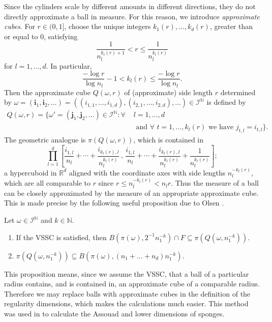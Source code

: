Since the cylinders scale by different amounts in different directions, they do not directly approximate a ball in measure.  For this reason, we introduce \emph{approximate cubes}. For $r\in (0,1]$, choose the unique integers $k_1(r),\ldots,k_d(r)$, greater than or equal to 0, satisfying
\[
\frac{1}{n_l^{k_l(r)+1}}< r \leq \frac{1}{n_l^{k_l(r)}}
\]
for $l=1,\ldots,d$. In particular, 
\[
\frac{-\log r}{\log n_l}-1 < k_l(r) \leq \frac{-\log r}{\log n_l}.
\]
Then the approximate cube $Q(\omega, r)$ of (approximate) side length $r$ determined by $\omega =\left( \textbf{i}_1, \textbf{i}_2 , \ldots \right) =\left( (i_{1,1}, \dots, i_{1,d}), (i_{2,1}, \dots, i_{2,d}) , \ldots \right)    \in \mathcal{I}^{\mathbb{N}}$ is defined by
\begin{align*}
Q(\omega, r)=\big\{ \omega'=\left( \textbf{j}_1, \textbf{j}_2 , \ldots \right)\in \mathcal{I}^{\mathbb{N}} : \forall \, \,  &l=1, \ldots, d \\
&\text{ and } \forall\, \, t= 1, \ldots, k_l(r) \text{ we have } j_{t,l}=i_{t,l} \big\}.
\end{align*}
The geometric analogue is $\pi\left(Q(\omega, r)\right)$, which is contained in
\[ 
\prod_{l=1}^d \left[\frac{i_{1,l}}{n_l}+\cdots+\frac{i_{k_l(r),l}}{n_l^{k_l(r)}} \, , \, \frac{i_{1,l}}{n_l}+\cdots+\frac{i_{k_l(r),l}}{n_l^{k_l(r)}}+\frac{1}{n_l^{k_l(r)}} \right];
\]
a hypercuboid in $\mathbb{R}^d$ aligned with the coordinate axes with side lengths $n_l^{-k_l(r)}$, which are all comparable to $r$ since $ r \leq n_l^{-k_l(r)} < n_l r$.  Thus the measure of a ball can be closely approximated by the measure of an appropriate approximate cube.  This is made precise by the following useful proposition due to Olsen \cite[Proposition 6.2.1]{sponges}.
\begin{proposition} \label{ch-upper-reg:ballscubes}
	Let $\omega \in \mathcal{I}^{\mathbb{N}}$ and $k \in \mathbb{N}$.
	\begin{enumerate} 
		\item If the VSSC is satisfied, then $B\left( \pi(\omega), 2^{-1}n_1^{-k}\right)\cap F \subseteq \pi \left(Q\left( \omega, n_1^{-k} \right) \right).$ 
		\item  $\pi \left(Q\left( \omega, n_1^{-k} \right) \right) \subseteq B\left( \pi(\omega), (n_1+\dots+n_d)n_1^{-k}\right).$ 
	\end{enumerate}
\end{proposition}

This proposition means, since we assume the VSSC, that a ball of a particular radius contains, and is contained in, an approximate cube of a comparable radius.  Therefore we may replace balls with approximate cubes in the definition of the regularity dimensions, which makes the calculations much easier. This method was used in \cite[Proposition 3.1 and 3.5]{fraser-howroyd1} to calculate the Assouad and lower dimensions of sponges. 

